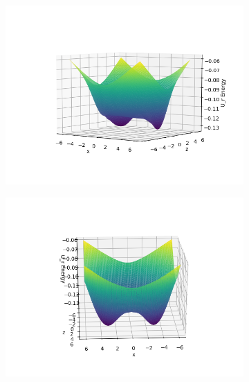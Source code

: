 \documentclass[../master_thesis.tex]{subfiles}
\begin{document}
\begin{figure}[h!]
  \centering
  \begin{subfigure}[b]{0.49\linewidth}
    \includegraphics[width=\linewidth]{img/Urpot5.png}
  \end{subfigure}
  \begin{subfigure}[b]{0.49\linewidth}
    \includegraphics[width=\linewidth]{img/Urpot2.png}
  \end{subfigure}
  \begin{subfigure}[b]{0.49\linewidth}

\end{subfigure}
\end{figure}
\end{document}
